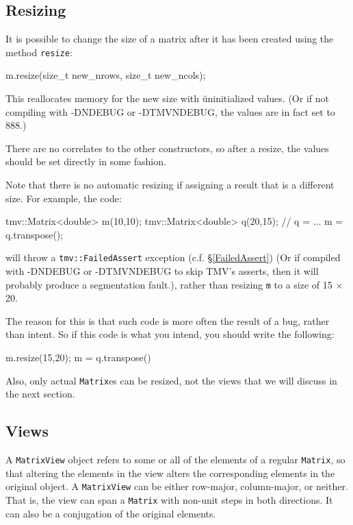 \documentclass[twoside,letterpaper,11pt]{article}
\renewcommand{\tt}[1]{{\lstinline {#1}}}
\begin{document}
\subsection{Resizing}
\label{Matrix_Resize}

It is possible to change the size of a matrix after it has been created using the method \tt{resize}:

\begin{tmvcode}
m.resize(size_t new_nrows, size_t new_ncols);
\end{tmvcode}

This reallocates memory for the new size with {\u uninitialized} values.  
(Or if not compiling with -DNDEBUG or -DTMVNDEBUG, the values are in fact set to 888.)

There are no correlates to the other constructors, so after a resize, the 
values should be set directly in some fashion.

Note that there is no automatic resizing if assigning a result that is a different size. 
For example, the code:
\begin{tmvcode}
tmv::Matrix<double> m(10,10);
tmv::Matrix<double> q(20,15);
// q = ...
m = q.transpose();
\end{tmvcode}
will throw a \tt{tmv::FailedAssert} exception (c.f. \S\ref{FailedAssert}) (Or if compiled with 
-DNDEBUG or -DTMVNDEBUG to skip TMV's asserts, then it will probably produce a segmentation fault.),
rather than resizing \tt{m} to a size of 15 $\times$ 20.  

The reason for this is that such code is more often the result of a bug, rather than intent.
So if this code is what you intend, you should write the following:
\begin{tmvcode}
m.resize(15,20);
m = q.transpose()
\end{tmvcode}

Also, only actual \tt{Matrix}es can be resized, not the views that we will discuss in the next section.

\subsection{Views}
\label{Matrix_Views}

A \tt{MatrixView} object refers to some or all of the elements of a regular \tt{Matrix},
so that altering the elements in the view alters the
corresponding elements in the original object.  A \tt{MatrixView}
can be either row-major, column-major, or neither.  That is, the view can 
span a \tt{Matrix} with non-unit steps in both directions.
It can also be a conjugation of the original
elements.
\end{document}
